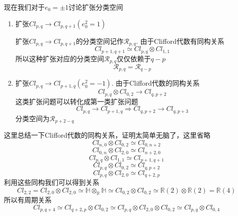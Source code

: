\documentclass[a4paper]{article}
\numberwithin{equation}{subsection}
\begin{document}
现在我们对于$e_0=\pm 1$讨论扩张分类空间
\begin{enumerate}
    \item 扩张$Cl_{p,q}\rightarrow Cl_{p,q+1}(e_0^2=1)$
    
    扩张$Cl_{p,q}\rightarrow Cl_{p,q+1}$的分类空间记作$\mathcal{R}_{p,q}$. 由于Clifford代数有同构关系
\begin{equation}
    Cl_{p+1,q+1}\simeq Cl_{p,q}\otimes Cl_{1,1}
\end{equation}
所以这种扩张对应的分类空间$\mathcal{R}_{p,q}$仅仅依赖于$q-p$
\begin{equation}
    \mathcal{R}_{p,q}=\mathcal{R}_{q-p}
\end{equation}
    \item 扩张$Cl_{p,q}\rightarrow Cl_{p+1,q}(e_0^2=-1)$. 由于Clifford代数的同构关系
    \begin{equation}
        Cl_{p,q}\otimes Cl_{0,2}\rightarrow Cl_{q,p+2}
    \end{equation}
    这类扩张问题可以转化成第一类扩张问题
    \begin{equation}
        Cl_{p,q}\rightarrow Cl_{p+1,q}\Rightarrow Cl_{q,p+2}\rightarrow Cl_{q,p+3}
    \end{equation}
    分类空间为$\mathcal{R}_{p+2-q}$
\end{enumerate}
这里总结一下Clifford代数的同构关系，证明太简单无脑了，这里省略
\begin{equation}
    Cl_{n,0}\otimes Cl_{0,2} \simeq Cl_{0,n+2}
\end{equation}
\begin{equation}
    C l_{0, n} \otimes C l_{2,0} \simeq C l_{n+2,0}
\end{equation}
\begin{equation}
    C l_{p,q} \otimes C l_{1,1} \simeq C l_{p+1, q+1}
\end{equation}
\begin{equation}
    Cl_{p, q} \otimes Cl_{0,2} \simeq Cl_{q,p+2}
\end{equation}
\begin{equation}
    Cl_{p,q} \otimes C l_{2,0} \simeq C l_{q+2, p}
\end{equation}
利用这些同构我们可以得到关系
\begin{equation}
    Cl_{2,2}=Cl_{2,0} \otimes Cl_{2,0} \simeq \mathbb{H}\otimes_\mathbb{R} \mathbb{H} \simeq Cl_{0,2} \otimes Cl_{0,2} \simeq \mathbb{R}(2) \otimes \mathbb{R}(2)=\mathbb{R}(4)
\end{equation}
所以有周期关系
\begin{equation}
    Cl_{p,q+4}\simeq Cl_{q+2,p}\otimes Cl_{0,2}\simeq Cl_{p,q}\otimes Cl_{2,0}\otimes Cl_{0,2}\simeq Cl_{p,q}\otimes Cl_{0,4}
\end{equation}
\end{document}
